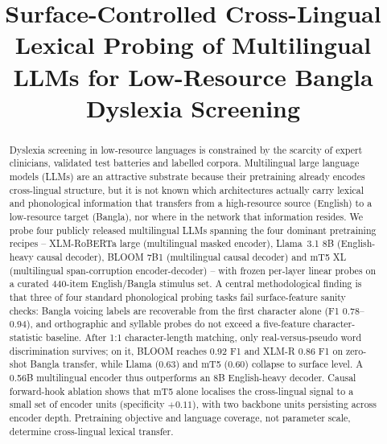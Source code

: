 \documentclass[conference]{IEEEtran}
\begin{document}
\title{Surface-Controlled Cross-Lingual Lexical Probing of Multilingual LLMs for Low-Resource Bangla Dyslexia Screening}

\author{
\and
{}
}

\maketitle

\begin{abstract}
Dyslexia screening in low-resource languages is constrained by the scarcity of expert clinicians, validated test batteries and labelled corpora. Multilingual large language models (LLMs) are an attractive substrate because their pretraining already encodes cross-lingual structure, but it is not known which architectures actually carry lexical and phonological information that transfers from a high-resource source (English) to a low-resource target (Bangla), nor where in the network that information resides. We probe four publicly released multilingual LLMs spanning the four dominant pretraining recipes -- XLM-RoBERTa large (multilingual masked encoder), Llama~3.1 8B (English-heavy causal decoder), BLOOM 7B1 (multilingual causal decoder) and mT5 XL (multilingual span-corruption encoder-decoder) -- with frozen per-layer linear probes on a curated 440-item English/Bangla stimulus set. A central methodological finding is that three of four standard phonological probing tasks fail surface-feature sanity checks: Bangla voicing labels are recoverable from the first character alone (F1 0.78--0.94), and orthographic and syllable probes do not exceed a five-feature character-statistic baseline. After 1:1 character-length matching, only real-versus-pseudo word discrimination survives; on it, BLOOM reaches 0.92 F1 and XLM-R 0.86 F1 on zero-shot Bangla transfer, while Llama (0.63) and mT5 (0.60) collapse to surface level. A 0.56B multilingual encoder thus outperforms an 8B English-heavy decoder. Causal forward-hook ablation shows that mT5 alone localises the cross-lingual signal to a small set of encoder units (specificity $+0.11$), with two backbone units persisting across encoder depth. Pretraining objective and language coverage, not parameter scale, determine cross-lingual lexical transfer.
\end{abstract}
\end{document}
